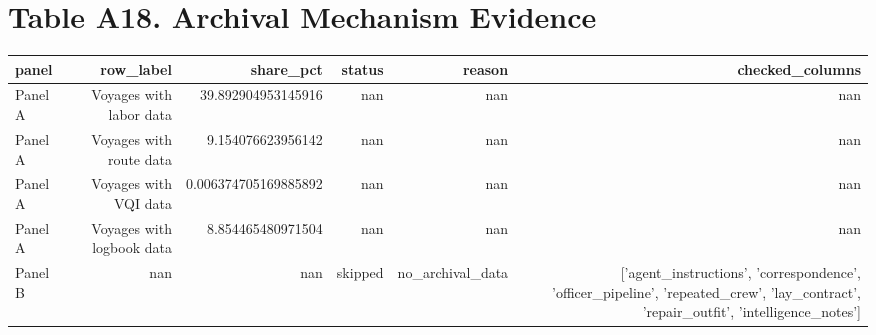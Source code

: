\documentclass{article}
\begin{document}
\section*{Table A18. Archival Mechanism Evidence}
\begin{tabular}{lrrrrr}
\hline
panel & row_label & share_pct & status & reason & checked_columns \\
\hline
Panel A & Voyages with labor data & 39.892904953145916 & nan & nan & nan \\
Panel A & Voyages with route data & 9.154076623956142 & nan & nan & nan \\
Panel A & Voyages with VQI data & 0.006374705169885892 & nan & nan & nan \\
Panel A & Voyages with logbook data & 8.854465480971504 & nan & nan & nan \\
Panel B & nan & nan & skipped & no\_archival\_data & ['agent\_instructions', 'correspondence', 'officer\_pipeline', 'repeated\_crew', 'lay\_contract', 'repair\_outfit', 'intelligence\_notes'] \\
\hline
\end{tabular}
\end{document}
